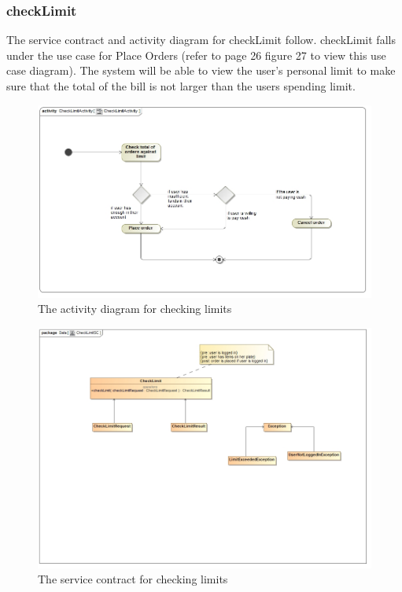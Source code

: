 \documentclass[a4paper,12pt]{report}
\begin{document}
\subsubsection{checkLimit}
The service contract and activity diagram for checkLimit follow. checkLimit falls under the use case for Place Orders (refer to page 26 figure 27 to view this use case diagram). The system will be able to view the user's personal limit to make sure that the total of the bill is not larger than the users spending limit. 
\begin{figure}[H]
  \centering
    \includegraphics[width=1.0\textwidth]{../images/CheckLimitActivity.jpg}
    \caption{The activity diagram for checking limits} 
\end{figure}

\begin{figure}[H]
	\centering
	\includegraphics[width=1.0\textwidth]{../images/CheckLimitSC.jpg}
	\caption{The service contract for checking limits}
\end{figure}
\end{document}
